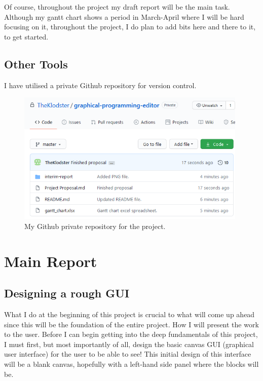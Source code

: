 \documentclass[a4paper, 12pt]{article}
\begin{document}
            Of course, throughout the project my draft report will be the main task. Although
            my gantt chart shows a period in March-April where I will be hard focusing on it,
            throughout the project, I do plan to add bits here and there to it, to get started.

        \subsection{Other Tools}
            I have utilised a private Github repository for version control.

            \begin{figure}[h]
                \centering
                \includegraphics[width=110mm]{github.png}
                \caption{My Github private repository for the project.}
            \end{figure}
    
    \clearpage
    \section{Main Report}
        \subsection{Designing a rough GUI}
            What I do at the beginning of this project is crucial to what will come up ahead since this
            will be the foundation of the entire project. How I will present the work to the user. Before
            I can begin getting into the deep fundamentals of this project, I must first, but most
            importantly of all, design the basic canvas GUI (graphical user interface) for the user to
            be able to see! This initial design of this interface will be a blank canvas, hopefully
            with a left-hand side panel where the blocks will be. \\
\end{document}
